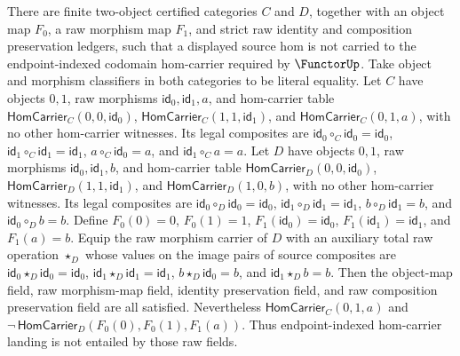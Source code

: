 \begin{theorem}\label{thm:raw-functor-hom-carrier-landing-obstruction}
There are finite two-object certified categories $C$ and $D$, together with an object map $F_0$, a raw morphism map $F_1$, and strict raw identity and composition preservation ledgers, such that a displayed source hom is not carried to the endpoint-indexed codomain hom-carrier required by $\FunctorUp$. Take object and morphism classifiers in both categories to be literal equality.
Let $C$ have objects $0,1$, raw morphisms $\mathsf{id}_0,\mathsf{id}_1,a$, and hom-carrier table $\mathsf{HomCarrier}_{C}(0,0,\mathsf{id}_0)$, $\mathsf{HomCarrier}_{C}(1,1,\mathsf{id}_1)$, and $\mathsf{HomCarrier}_{C}(0,1,a)$, with no other hom-carrier witnesses. Its legal composites are $\mathsf{id}_0\circ_C\mathsf{id}_0=\mathsf{id}_0$, $\mathsf{id}_1\circ_C\mathsf{id}_1=\mathsf{id}_1$, $a\circ_C\mathsf{id}_0=a$, and $\mathsf{id}_1\circ_C a=a$.
Let $D$ have objects $0,1$, raw morphisms $\mathsf{id}_0,\mathsf{id}_1,b$, and hom-carrier table $\mathsf{HomCarrier}_{D}(0,0,\mathsf{id}_0)$, $\mathsf{HomCarrier}_{D}(1,1,\mathsf{id}_1)$, and $\mathsf{HomCarrier}_{D}(1,0,b)$, with no other hom-carrier witnesses. Its legal composites are $\mathsf{id}_0\circ_D\mathsf{id}_0=\mathsf{id}_0$, $\mathsf{id}_1\circ_D\mathsf{id}_1=\mathsf{id}_1$, $b\circ_D\mathsf{id}_1=b$, and $\mathsf{id}_0\circ_D b=b$.
Define $F_0(0)=0$, $F_0(1)=1$, $F_1(\mathsf{id}_0)=\mathsf{id}_0$, $F_1(\mathsf{id}_1)=\mathsf{id}_1$, and $F_1(a)=b$. Equip the raw morphism carrier of $D$ with an auxiliary total raw operation $\star_D$ whose values on the image pairs of source composites are $\mathsf{id}_0\star_D\mathsf{id}_0=\mathsf{id}_0$, $\mathsf{id}_1\star_D\mathsf{id}_1=\mathsf{id}_1$, $b\star_D\mathsf{id}_0=b$, and $\mathsf{id}_1\star_D b=b$.
Then the object-map field, raw morphism-map field, identity preservation field, and raw composition preservation field are all satisfied. Nevertheless $\mathsf{HomCarrier}_{C}(0,1,a)$ and $\neg\,\mathsf{HomCarrier}_{D}(F_0(0),F_0(1),F_1(a))$. Thus endpoint-indexed hom-carrier landing is not entailed by those raw fields.
\end{theorem}
